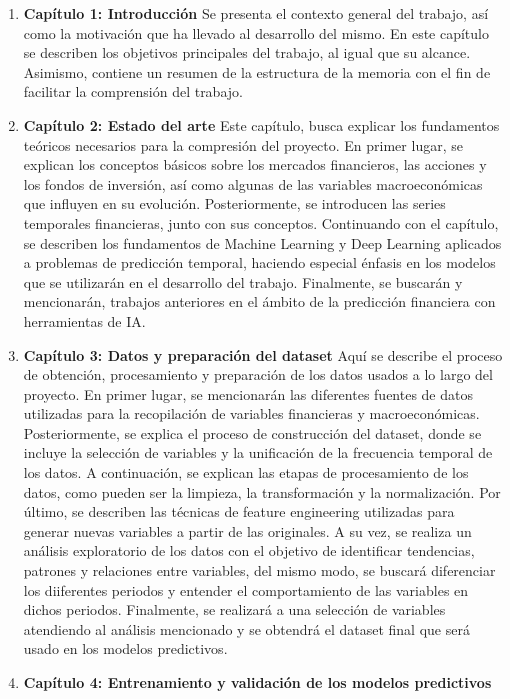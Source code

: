 \begin{enumerate}
    \item \textbf{Capítulo 1: Introducción}
    Se presenta el contexto general del trabajo, así como la motivación que ha llevado al desarrollo del mismo. En este capítulo se describen los objetivos principales del trabajo, al igual que su alcance. Asimismo, contiene un resumen de la estructura de la memoria con el fin de facilitar la comprensión del trabajo.
    \item \textbf{Capítulo 2: Estado del arte}
    Este capítulo, busca explicar los fundamentos teóricos necesarios para la compresión del proyecto. En primer lugar, se explican los conceptos básicos sobre los mercados financieros, las acciones y los fondos de inversión, así como algunas de las variables macroeconómicas que influyen en su evolución. Posteriormente, se introducen las series temporales financieras, junto con sus conceptos. Continuando con el capítulo, se describen los fundamentos de Machine Learning y Deep Learning aplicados a problemas de predicción temporal, haciendo especial énfasis en los modelos que se utilizarán en el desarrollo del trabajo. Finalmente, se buscarán y mencionarán, trabajos anteriores en el ámbito de la predicción financiera con herramientas de IA.
    \item \textbf{Capítulo 3: Datos y preparación del dataset}
    Aquí se describe el proceso de obtención, procesamiento y preparación de los datos usados a lo largo del proyecto. En primer lugar, se mencionarán las diferentes fuentes de datos utilizadas para la recopilación de variables financieras y macroeconómicas. Posteriormente, se explica el proceso de construcción del dataset, donde se incluye la selección de variables y la unificación de la frecuencia temporal de los datos. A continuación, se explican las etapas de procesamiento de los datos, como pueden ser la limpieza, la transformación y la normalización. Por último, se describen las técnicas de feature engineering utilizadas para generar nuevas variables a partir de las originales. A su vez, se realiza un análisis exploratorio de los datos con el objetivo de identificar tendencias, patrones y relaciones entre variables, del mismo modo, se buscará diferenciar los diiferentes periodos y entender el comportamiento de las variables en dichos periodos. Finalmente, se realizará a una selección de variables atendiendo al análisis mencionado y se obtendrá el dataset final que será usado en los modelos predictivos.
    \item \textbf{Capítulo 4: Entrenamiento y validación de los modelos predictivos}

\end{enumerate}
